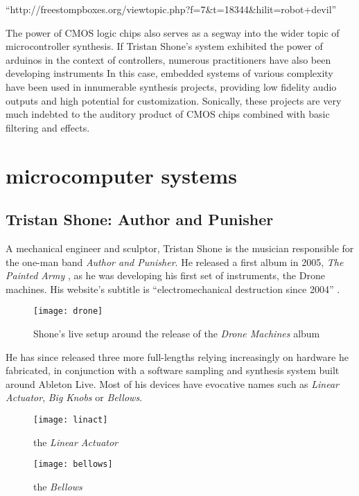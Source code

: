 ``http://freestompboxes.org/viewtopic.php?f=7&t=18344&hilit=robot+devil''

The power of CMOS logic chips also serves as a segway into the wider topic of microcontroller synthesis. If Tristan Shone's system exhibited the power of arduinos in the context of controllers, numerous practitioners have also been developing instruments  In this case, embedded systems of various complexity have been used in innumerable synthesis projects, providing low fidelity audio outputs and high potential for customization. Sonically, these projects are very much indebted to the auditory product of CMOS chips combined with basic filtering and effects. 

\section{microcomputer systems}

\subsection{Tristan Shone: Author and Punisher}

A mechanical engineer and sculptor, Tristan Shone is the musician responsible for the one-man band \emph{Author and Punisher}. He released a first album in 2005, \emph{The Painted Army} \citep{shone,2005}, as he was developing his first set of instruments, the Drone machines. His website's subtitle is ``electromechanical destruction since 2004'' \citep{shone2004}.

	\begin{figure}[h!]
	  \caption{Shone's live setup around the release of the \emph{Drone Machines} album}
	  \centering
	    \texttt{[image: drone]}
	\end{figure}
	
He has since released three more full-lengths relying increasingly on hardware he fabricated, in conjunction with a software sampling and synthesis system built around Ableton Live. Most of his devices have evocative names such as \emph{Linear Actuator}, \emph{Big Knobs} or \emph{Bellows}. 

	\begin{figure}[h!]
	  \caption{the \emph{Linear Actuator}}
	  \centering
	    \texttt{[image: linact]}
	\end{figure}

	\begin{figure}[h!]
	  \caption{the \emph{Bellows}}
	  \centering
	    \texttt{[image: bellows]}
	\end{figure}

